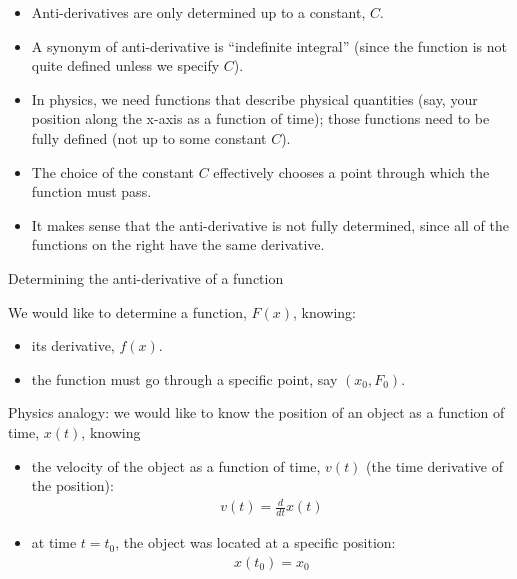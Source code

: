 \documentclass[aspectratio=169,
hyperref={colorlinks,urlcolor=blue}
]{beamer}
\begin{document}
{

\begin{itemize}
\item Anti-derivatives are only determined up to a constant, $C$.
\item A synonym of anti-derivative is ``indefinite integral'' (since the function is not quite defined unless we specify $C$).
\item In physics, we need functions that describe physical quantities (say, your position along the x-axis as a function of time); those functions need to be fully defined (not up to some constant $C$).
\item The choice of the constant $C$ effectively chooses a point through which the function must pass.
\item It makes sense that the anti-derivative is not fully determined, since all of the functions on the right have the same derivative.
\end{itemize}

}
{
\centering
{}
}


\begin{bulletframe} {Determining the anti-derivative of a function} 
\item We would like to determine a function, $F(x)$, knowing:
\begin{itemize}
\item its derivative, $f(x)$.
\item the function must go through a specific point, say $(x_0,F_0)$.
\end{itemize}
\item Physics analogy: we would like to know the position of an object as a function of time, $x(t)$, knowing
\begin{itemize}
\item the velocity of the object as a function of time, $v(t)$ (the time derivative of the position):
\begin{align*}
v(t)=\frac{d}{dt} x(t)
\end{align*}
\item at time $t=t_0$, the object was located at a specific position:
\begin{align*}
x(t_0)=x_0
\end{align*}
\end{itemize}
\end{bulletframe}
\end{document}
